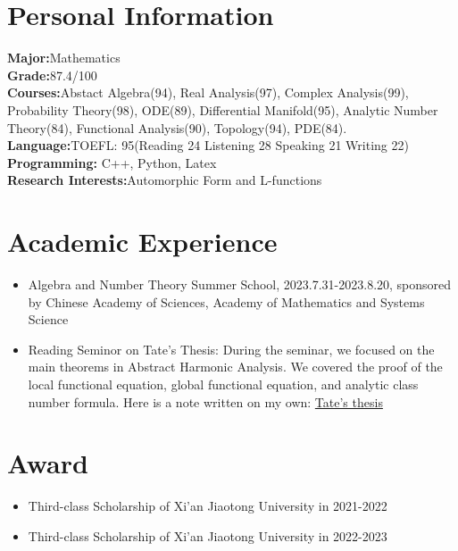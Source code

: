 \documentclass[a4paper,12pt]{article}
\begin{document}
\section{Personal Information}
\textbf{Major:}Mathematics\\
\textbf{Grade:}87.4/100\\
\textbf{Courses:}Abstact Algebra(94), Real Analysis(97), Complex Analysis(99), Probability Theory(98), ODE(89), Differential Manifold(95), 
Analytic Number Theory(84), Functional Analysis(90), Topology(94), PDE(84).\\
\textbf{Language:}TOEFL: 95(Reading 24 Listening 28 Speaking 21 Writing 22)\\
\textbf{Programming:} C++, Python, Latex\\
\textbf{Research Interests:}Automorphic Form and L-functions \\
\section{Academic Experience}
\begin{itemize}
    \item Algebra and Number Theory Summer School, 2023.7.31-2023.8.20, sponsored by Chinese Academy of Sciences, Academy of Mathematics and Systems Science
    \item Reading Seminor on Tate's Thesis: During the seminar, we focused on the main theorems in Abstract Harmonic Analysis. We covered the proof of the local functional equation, global functional equation, and analytic class number formula.
    Here is a note written on my own: \href{https://wez2003.github.io/paper/tatethesis.pdf}{Tate's thesis} 
\end{itemize}
\section{Award}
\begin{itemize}
    \item Third-class Scholarship of Xi'an Jiaotong University in 2021-2022
    \item Third-class Scholarship of Xi'an Jiaotong University in 2022-2023
\end{itemize}
\end{document}
